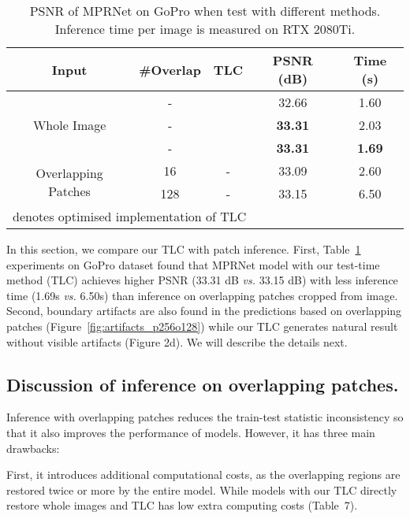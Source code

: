 \documentclass[runningheads]{llncs}
\newcommand{\cmark}{\ding{51}\xspace}\newcommand{\cmarkg}{\textcolor{lightgray}{\ding{51}}\xspace}\newcommand{\xmark}{\ding{55}\xspace}\newcommand{\xmarkg}{\textcolor{lightgray}{\ding{55}}\xspace}
\begin{document}
\begin{table}[b]
\setlength{\tabcolsep}{6pt}
\centering
\vspace{-2mm}
\caption{PSNR of MPRNet on GoPro when test with different methods. Inference time per image is measured on RTX 2080Ti.}
\vspace{-2mm}
\label{tab:tlc_vs_overlap}
\begin{tabular}{ccccc}
\toprule
Input                 & \#Overlap & TLC & PSNR (dB)  & Time (s) \\ \midrule
\multirow{3}{*}{Whole Image}
 & -       & \xmarkg   & 32.66 & 1.60     \\
 & -       & \cmark   & \textbf{33.31} & 2.03     \\ 
    & -       & ~~\cmark   & \textbf{33.31} & \textbf{1.69}     \\ \midrule
\multirow{2}{*}{Overlapping Patches}          & 16      & -   & 33.09 & 2.60     \\
 & 128     & -   & 33.15 & 6.50   \\
\bottomrule
\multicolumn{5}{l}{ denotes optimised implementation of TLC}
\vspace{-3mm}
\end{tabular}
\end{table}

In this section, we compare our TLC with patch inference.
First, Table~\ref{tab:tlc_vs_overlap} experiments on GoPro dataset found that MPRNet model with our test-time method (TLC) achieves higher PSNR (33.31 dB \textit{vs.} 33.15 dB) with less inference time (1.69s \textit{vs.} 6.50s) than inference on overlapping patches cropped from image.
Second, boundary artifacts are also found in the predictions based on overlapping patches (Figure~\ref{fig:artifacts_p256o128}) while our TLC generates natural result without visible artifacts (Figure 2d).
We will describe the details next.


\subsection{Discussion of inference on overlapping patches.} 
Inference with overlapping patches reduces the train-test statistic inconsistency so that it also improves the performance of models. However, it has three main drawbacks:

First, it introduces additional computational costs, as the overlapping regions are restored twice or more by the entire model. While models with our TLC directly restore whole images and TLC has low extra computing costs (Table~7). 
\end{document}
